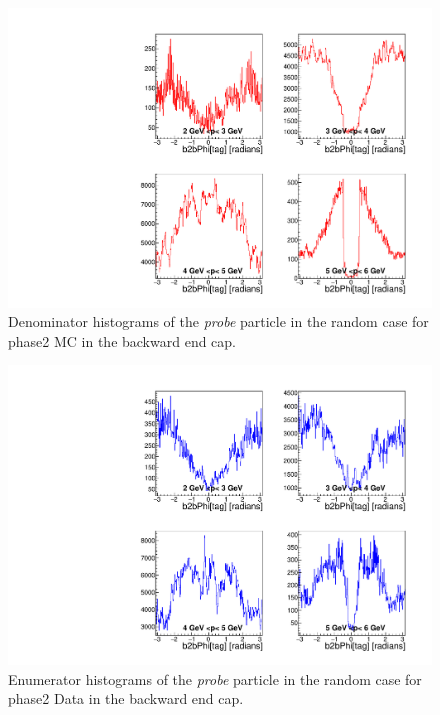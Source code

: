 \documentclass[a4paper,11pt,twosided,final,german,openbib,pdftex,listof=totoc,bibliography=totoc]{scrbook}
\begin{document}
\begin{appendix}
\begin{figure}[!htbp]
	\centering
	\includegraphics[width=\textwidth]{Plots/master/xPMPhiRandomECD_MC}
	\caption[Momentum $\phi$ Random Backward End Cap Denominator Histogram Phase2 MC]{Denominator histograms of the \textit{probe} particle in the random case for phase2 MC in the backward end cap.}
	\label{plt:PMPhiRandomECD_MC}
\end{figure}


\begin{figure}[!htbp]
	\centering
	\includegraphics[width=\textwidth]{Plots/master/xPMPhiRandomECE_Data}
	\caption[Momentum $\phi$ Random Backward End Cap Enumerator Histogram Phase2 Data]{Enumerator histograms of the \textit{probe} particle in the random case for phase2 Data in the backward end cap.}
	\label{plt:PMPhiRandomECE_Data}
\end{figure}



\end{appendix}
\end{document}
